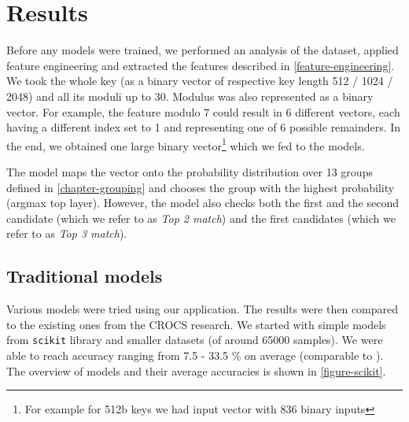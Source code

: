 \chapter{Results}
\label{chapter-results}

Before any models were trained, we performed an analysis of the dataset, applied feature engineering and extracted the features described in \autoref{feature-engineering}. We took the whole key (as a binary vector of respective key length 512 / 1024 / 2048) and all its moduli up to 30. Modulus was also represented as a binary vector. For example, the feature modulo 7 could result in 6 different vectors, each having a different index set to 1 and representing one of 6 possible remainders. In the end, we obtained one large binary vector\footnote{For example for 512b keys we had input vector with 836 binary inputs} which we fed to the models. 

The model maps the vector onto the probability distribution over 13 groups defined in \autoref{chapter-grouping} and chooses the group with the highest probability (argmax top layer). However, the model also checks both the first and the second candidate (which we refer to as \textit{Top 2 match}) and the first candidates (which we refer to as \textit{Top 3 match}).

\section{Traditional models}

Various models were tried using our application. The results were then compared to the existing ones from the CROCS research. We started with simple models from \texttt{scikit} library and smaller datasets (of around 65000 samples). We were able to reach accuracy ranging from 7.5 - 33.5 \% on average (comparable to \cite{thesis_sekan}). The overview of models and their average accuracies is shown in \autoref{figure-scikit}.

